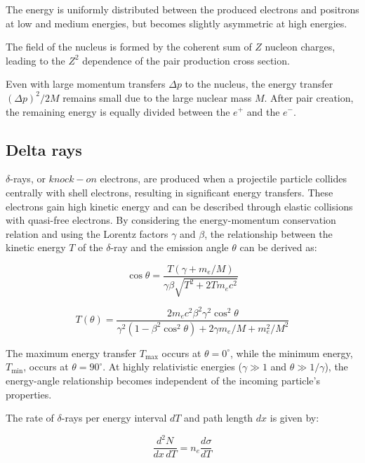 The energy is uniformly distributed between the produced 
electrons and positrons at low and medium energies, but becomes 
slightly asymmetric at high energies.

The field of the nucleus is formed by the coherent sum of $Z$ 
nucleon charges, leading to the $Z^2$ dependence of the pair 
production cross section.

Even with large momentum transfers $\Delta p$ to the nucleus, 
the energy transfer $(\Delta p)^2/2M$ remains small due to the 
large nuclear mass $M$. After pair creation, the remaining 
energy is equally divided between the $e^+$ and the $e^-$.

\subsection{Delta rays}
$\delta$-rays, or $knock-on$ electrons, 
are produced when a projectile particle collides 
centrally with shell electrons, resulting in 
significant energy transfers.
These electrons 
gain high kinetic energy and can be described 
through elastic collisions with quasi-free electrons. 
By considering the energy-momentum conservation relation 
and using the Lorentz factors $\gamma$ and $\beta$, the 
relationship between the kinetic energy $T$ of the 
$\delta$-ray and the emission angle $\theta$ can be derived as:

\begin{equation}
\cos \theta = \frac{T(\gamma + m_e / M)}{\gamma \beta \sqrt{T^2 + 2T m_e c^2}}
\end{equation}

\begin{equation}
T(\theta) = \frac{2 m_e c^2 \beta^2 \gamma^2 \cos^2 \theta}{\gamma^2(1 - \beta^2 \cos^2 \theta) + 2 \gamma m_e / M + m_e^2 / M^2}
\end{equation}

The maximum energy transfer $T_{\text{max}}$ occurs at $\theta = 0^\circ$, 
while the minimum energy, $T_{\text{min}}$, occurs at $\theta = 90^\circ$. 
At highly relativistic energies ($\gamma \gg 1$ and $\theta \gg 1/\gamma$), 
the energy-angle relationship becomes independent of the incoming particle's properties.

The rate of $\delta$-rays per energy interval $dT$ and path length $dx$ is given by:

\begin{equation}
\frac{d^2 N}{dx \, dT} = n_e \frac{d\sigma}{dT}
\end{equation}

